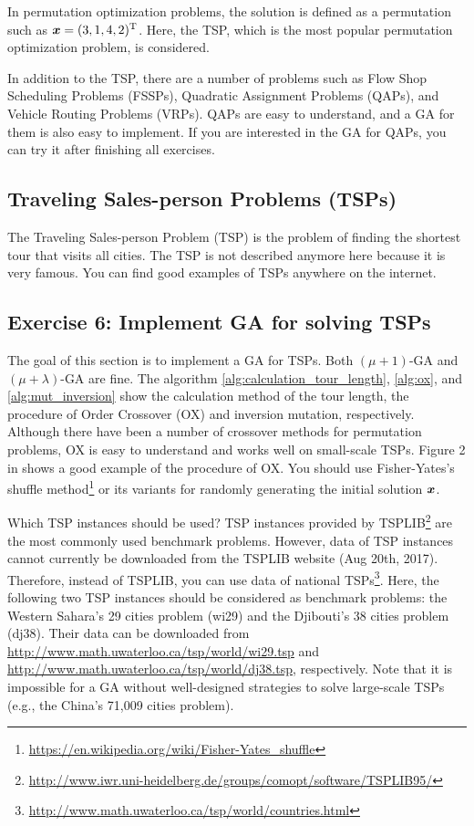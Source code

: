 \documentclass[11pt]{article}
\def\vector#1{\mbox{\boldmath $#1$}}
\def\vector#1{\mbox{\boldmath $#1$}}
\begin{document}
In permutation optimization problems, the solution is defined as a permutation such as $\vector{x} = (3, 1, 4, 2)^{\rm T}$.
Here, the TSP, which is the most popular permutation optimization problem, is considered.

In addition to the TSP, there are a number of problems such as Flow Shop Scheduling Problems (FSSPs), Quadratic Assignment Problems (QAPs), and Vehicle Routing Problems (VRPs).
QAPs are easy to understand, and a GA for them is also easy to implement.
If you are interested in the GA for QAPs, you can try it after finishing all exercises.


\subsection{Traveling Sales-person Problems (TSPs)}

The Traveling Sales-person Problem (TSP) is the problem of finding the shortest tour that visits all cities.
The TSP is not described anymore here because it is very famous. You can find good examples of TSPs anywhere on the internet.


\subsection{Exercise 6: Implement GA for solving TSPs}

The goal of this section is to implement a GA for TSPs.
Both $(\mu + 1)$-GA and $(\mu + \lambda)$-GA are fine.
%
The algorithm \ref{alg:calculation_tour_length}, \ref{alg:ox}, and \ref{alg:mut_inversion} show the calculation method of the tour length, the procedure of Order Crossover (OX) and inversion mutation, respectively.
Although there have been a number of crossover methods for permutation problems, OX is easy to understand and works well on small-scale TSPs.
Figure 2 in \cite{StarkweatherMMWW91} shows a good example of the procedure of OX.
You should use Fisher-Yates's shuffle method\footnote{\url{https://en.wikipedia.org/wiki/Fisher-Yates_shuffle}} or its variants for randomly generating the initial solution $\vector{x}$.

Which TSP instances should be used?
%
TSP instances provided by TSPLIB\footnote{\url{http://www.iwr.uni-heidelberg.de/groups/comopt/software/TSPLIB95/}} are the most commonly used benchmark problems.
However, data of TSP instances cannot currently be downloaded from the TSPLIB website  (Aug 20th, 2017).
Therefore, instead of TSPLIB, you can use data of national TSPs\footnote{\url{http://www.math.uwaterloo.ca/tsp/world/countries.html}}.
Here, the following two TSP instances should be considered as benchmark problems:  the Western Sahara's 29 cities problem (wi29) and the Djibouti's  38 cities problem (dj38).
Their data can be downloaded from \url{http://www.math.uwaterloo.ca/tsp/world/wi29.tsp} and \url{http://www.math.uwaterloo.ca/tsp/world/dj38.tsp}, respectively.
Note that it is impossible for a GA without well-designed strategies to solve large-scale TSPs (e.g., the China's 71,009 cities problem).
\end{document}
